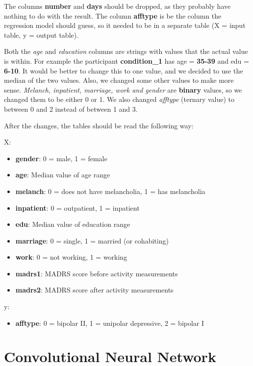 The columns \textbf{number} and \textbf{days} should be dropped, as they probably have nothing to do with the result. 
The column \textbf{afftype} is be the column the regression model should guess, so it needed to be in a separate table (X = input table, y = output table).

Both the \textit{age} and \textit{education} columns are strings with values that the actual value is within. For example the participant \textbf{condition\_1} 
has age = \textbf{35-39} and edu = \textbf{6-10}. It would be better to change this to one value, and we decided to use the median of the two values.
Also, we changed some other values to make more sense. \textit{Melanch, inpatient, marriage, work and gender} are \textbf{binary} values, 
so we changed them to be either 0 or 1. We also changed \textit{afftype} (ternary value) to between 0 and 2 instead of between 1 and 3.

\newpage
After the changes, the tables should be read the following way:

X:
\begin{itemize}
  \item \textbf{gender}: 0 = male, 1 = female
  \item \textbf{age}: Median value of age range
  \item \textbf{melanch}: 0 = does not have melancholia, 1 = has melancholia
  \item \textbf{inpatient}: 0 = outpatient, 1 = inpatient
  \item \textbf{edu}: Median value of education range
  \item \textbf{marriage}: 0 = single, 1 = married (or cohabiting)
  \item \textbf{work}: 0 = not working, 1 = working
  \item \textbf{madrs1}: MADRS score before activity measurements
  \item \textbf{madrs2}: MADRS score after activity measurements
\end{itemize}

y:
\begin{itemize}
  \item \textbf{afftype}: 0 = bipolar II, 1 = unipolar depressive, 2 = bipolar I
\end{itemize}

\section{Convolutional Neural Network}

